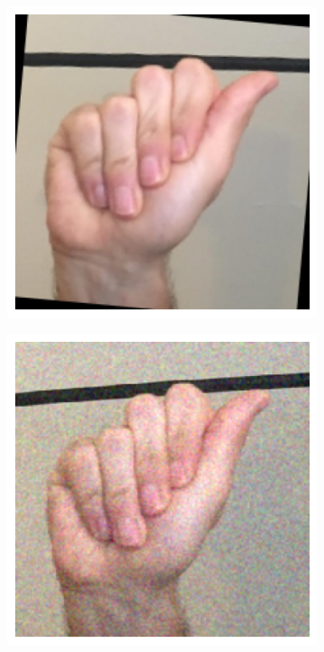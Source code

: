 \begin{figure}[H]
\begin{subfigure}{0.18\textwidth}
      \caption{}
    \end{subfigure}
    \hspace{0.005\textwidth}
    \begin{subfigure}{0.18\textwidth}
      \includegraphics[width=\linewidth]{images/2-recunoasterea-asl/imagine_a_rotate.png}
      \caption{}
    \end{subfigure}
    \hspace{0.005\textwidth}
    \begin{subfigure}{0.18\textwidth}
      \includegraphics[width=\linewidth]{images/2-recunoasterea-asl/imagine_a_gauss_noise.png}

\end{subfigure}
\end{figure}
